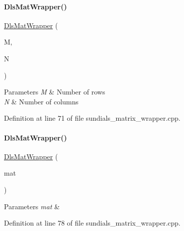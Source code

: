 \paragraph{\texorpdfstring{DlsMatWrapper()}{DlsMatWrapper()}\hspace{0.1cm}{\footnotesize\ttfamily [1/4]}}
{\footnotesize\ttfamily \mbox{\hyperlink{classamici_1_1_dls_mat_wrapper}{Dls\+Mat\+Wrapper}} (\begin{DoxyParamCaption}\item[{long int}]{M,  }\item[{long int}]{N }\end{DoxyParamCaption})}


\begin{DoxyParams}{Parameters}
{\em M} & Number of rows \\
\hline
{\em N} & Number of columns \\
\hline
\end{DoxyParams}


Definition at line 71 of file sundials\+\_\+matrix\+\_\+wrapper.\+cpp.

\mbox{\label{classamici_1_1_dls_mat_wrapper_ad3985d43ebee5728e703e4fbd2ce399b}} 
\paragraph{\texorpdfstring{DlsMatWrapper()}{DlsMatWrapper()}\hspace{0.1cm}{\footnotesize\ttfamily [2/4]}}
{\footnotesize\ttfamily \mbox{\hyperlink{classamici_1_1_dls_mat_wrapper}{Dls\+Mat\+Wrapper}} (\begin{DoxyParamCaption}\item[{Dls\+Mat}]{mat }\end{DoxyParamCaption})\hspace{0.3cm}{\ttfamily [explicit]}}


\begin{DoxyParams}{Parameters}
{\em mat} & \\
\hline
\end{DoxyParams}


Definition at line 78 of file sundials\+\_\+matrix\+\_\+wrapper.\+cpp.

\mbox{\label{classamici_1_1_dls_mat_wrapper_a101a5f6a7eed6a77db1669adc3275f94}} 
